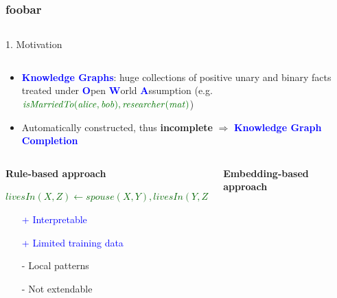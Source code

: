 \documentclass[t,final,hyperref={pdfpagelabels=true}]{beamer}
\date[\today]{\today}
\newcommand{\bl}[1]{\textcolor{blue}{#1}}
\newcommand{\gr}[1]{\textcolor{darkgreen}{#1}}
\newcommand{\mi}[1]{\ensuremath{\mathit{#1}}}
\begin{document}
\vspace{-4.5cm}
\begin{frame}\frametitle{foobar}
	\vspace{-1.5cm}	
	\begin{columns}[t]
		\begin{column}{.5\textwidth}
			\begin{block}{1. Motivation}
				\begin{columns}[t]
					\begin{column}{1\textwidth}
						\vspace{-1.5em}
						\small
						\begin{itemize}							
							\item \bl{\textbf{Knowledge Graphs}}: huge collections of positive unary and binary facts treated under \textbf{\bl{O}}pen \textbf{\bl{W}}orld \textbf{\bl{A}}ssumption (e.g. $\gr{\mi{isMarriedTo(alice,bob)},\mi{researcher(mat)}}$)
							\item Automatically constructed, thus \textbf{\alert{incomplete}}
							      $\Rightarrow$ \bl{\textbf{Knowledge Graph Completion}}
						\end{itemize}
					\end{column}
					\begin{column}{.5\textwidth}
					\end{column}
				\end{columns}
				\vspace{0.75em}				
				\begin{columns}[t]					
					\begin{column}{.5\textwidth}
					\begin{beamerboxesrounded}[upper=uppercolbl,lower=lowercolbl,shadow=true]{\begin{center}{\smallskip\textbf{Rule-based approach}}\end{center}}
					\begin{flushleft}
					\bigskip\medskip
					\small \gr{$livesIn(X,Z) \leftarrow spouse(X,Y), livesIn(Y,Z)$}\\
					\begin{itemize}
					\item[\bl{+}] \bl{Interpretable}
					\item[\bl{+}] \bl{Limited training data}
					\item[\alert{-}] \alert{Local patterns}
					\item[\alert{-}] \alert{Not extendable}
					\end{itemize}
					\end{flushleft}
					\vspace{5px}
					\end{beamerboxesrounded}
					\end{column}
					\begin{column}{.47\textwidth}
					 \begin{beamerboxesrounded}[upper=uppercolbl,lower=lowercolbl,shadow=true]{\begin{center}{\smallskip\textbf{Embedding-based approach}}\end{center}}


\end{beamerboxesrounded}
\end{column}
\end{columns}
\end{block}
\end{column}
\end{columns}
\end{frame}
\end{document}

